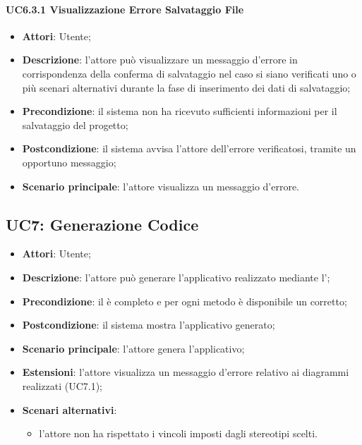 \paragraph{UC6.3.1 Visualizzazione Errore Salvataggio File}
\begin{itemize}
	\item \textbf{Attori}: Utente;
	\item \textbf{Descrizione}: l'attore può visualizzare un messaggio d'errore in corrispondenza della conferma di salvataggio nel caso si siano verificati uno o più scenari alternativi durante la fase di inserimento dei dati di salvataggio;
	\item \textbf{Precondizione}: il sistema non ha ricevuto sufficienti informazioni per il salvataggio del progetto;
	\item \textbf{Postcondizione}: il sistema avvisa l'attore dell'errore verificatosi, tramite un opportuno messaggio;
	\item \textbf{Scenario principale}: l'attore visualizza un messaggio d'errore.
\end{itemize}

\subsection{UC7: Generazione Codice}
\label{UC7}
\begin{itemize}
	\item \textbf{Attori}: Utente;
	\item \textbf{Descrizione}: l'attore può generare l'applicativo realizzato mediante l';
	\item \textbf{Precondizione}: il  è completo e per ogni metodo è disponibile un  corretto;
	\item \textbf{Postcondizione}: il sistema mostra l'applicativo generato;
	\item \textbf{Scenario principale}: l'attore genera l'applicativo;
	\item \textbf{Estensioni}: l'attore visualizza un messaggio d'errore relativo ai diagrammi realizzati (UC7.1);
	\item \textbf{Scenari alternativi}:
	\begin{itemize}
		\item l'attore non ha rispettato i vincoli imposti dagli stereotipi scelti.
	\end{itemize}
\end{itemize}

